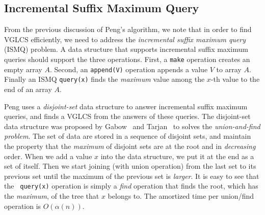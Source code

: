 




\subsection{Incremental Suffix Maximum Query}

From the previous discussion of Peng's algorithm, we note that in
order to find VGLCS efficiently, we need to address the {\em
  incremental suffix maximum query} (ISMQ) problem.  A data structure
that supports incremental suffix maximum queries should support the
three operations.  First, a {\tt make} operation creates an empty
array $A$. Second, an {\tt append(V)} operation appends a value $V$ to
array $A$. Finally an ISMQ {\tt query(x)} finds the {\em maximum}
value among the $x$-th value to the end of an array $A$.

Peng uses a {\em disjoint-set} data structure to answer incremental
suffix maximum queries, and finds a VGLCS from the answers of these
queries. The disjoint-set data structure was proposed by
Gabow~\cite{Gabow1983ALA} and Tarjan~\cite{Tarjan1975EfficiencyOA} to
solves the {\em union-and-find problem}.  The set of data are stored
in a sequence of disjoint sets, and maintain the property that the
{\em maximum} of disjoint sets are at the root and in {\em decreasing}
order.  When we add a value $x$ into the data structure, we put it at
the end as a set of itself.  Then we start joining (with union
operation) from the last set to its previous set until the maximum of
the previous set is {\em larger}.  It is easy to see that the {\tt
  query(x)} operation is simply a {\em find} operation that finds the
root, which has the {\em maximum}, of the tree that $x$ belongs to.
The amortized time per union/find operation is $O(\alpha(n))$.


